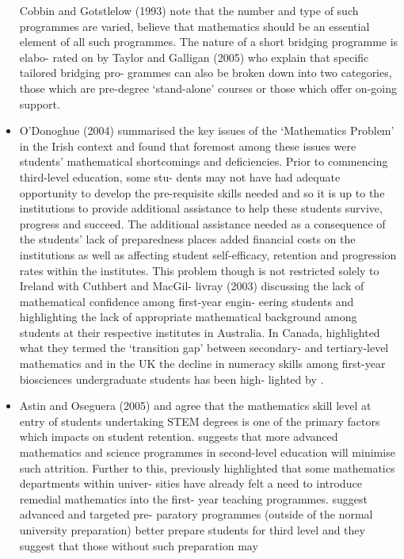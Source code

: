 \documentclass[twoside,12pt,a4paper]{report}
\begin{document}
\begin{itemize}
Cobbin and Gotstlelow (1993) note that the number and type of such programmes
are varied, \cite{Benn1994} believe that mathematics should be an essential
element of all such programmes. The nature of a short bridging programme is elabo-
rated on by Taylor and Galligan (2005) who explain that specific tailored bridging pro-
grammes can also be broken down into two categories, those which are pre-degree
‘stand-alone’ courses or those which offer on-going support. 
	\item O’Donoghue (2004) summarised the key issues of the ‘Mathematics Problem’ in the
Irish context and found that foremost among these issues were students’ mathematical
shortcomings and deficiencies. Prior to commencing third-level education, some stu-
dents may not have had adequate opportunity to develop the pre-requisite skills
needed and so it is up to the institutions to provide additional assistance to help
these students survive, progress and succeed. The additional assistance needed as a
consequence of the students’ lack of preparedness places added financial costs on
the institutions as well as affecting student self-efficacy, retention and progression
rates within the institutes.
This problem though is not restricted solely to Ireland with Cuthbert and MacGil-
livray (2003) discussing the lack of mathematical confidence among first-year engin-
eering students and \cite{Rylands2009} highlighting the lack of appropriate
mathematical background among students at their respective institutes in Australia.
In Canada, \cite{Kajander2005} highlighted what they termed the ‘transition
gap’ between secondary- and tertiary-level mathematics and in the UK the decline in
numeracy skills among first-year biosciences undergraduate students has been high-
lighted by \cite{Tariq2002}.
	\item Astin and Oseguera (2005) and \cite{Croft2009} agree
that the mathematics skill level at entry of students undertaking STEM degrees
is one of the primary factors which impacts on student retention. \cite{Robinson2003}
 suggests that more advanced mathematics and science programmes in
second-level education will minimise such attrition. Further to this, \cite{Kitchen1999}
previously highlighted that some mathematics departments within univer-
sities have already felt a need to introduce remedial mathematics into the first-
year teaching programmes. \cite{Moses2011} suggest advanced and targeted pre-
paratory programmes (outside of the normal university preparation) better prepare
students for third level and they suggest that those without such preparation may

\end{itemize}
\end{document}
